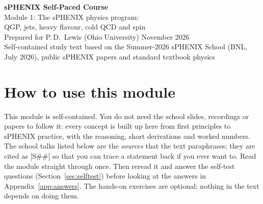 \documentclass[11pt,letterpaper]{article}
\begin{document}
\begin{center}
{\LARGE\bfseries sPHENIX Self-Paced Course}\\[4pt]
{\Large Module 1: The sPHENIX physics program:\\ QGP, jets, heavy flavour, cold QCD and spin}\\[8pt]
Prepared for P.\,D.\ Lewis (Ohio University) \quad November 2026\\[2pt]
\small Self-contained study text based on the Summer-2026 sPHENIX School (BNL, July 2026), public sPHENIX papers and standard textbook physics
\end{center}

\tableofcontents
\newpage

\section*{How to use this module}
This module is self-contained. You do not need the school slides, recordings or papers to follow it: every concept is
built up here from first principles to sPHENIX practice, with the reasoning, short derivations and worked numbers.
The school talks listed below are the \emph{sources} that the text paraphrases; they are cited as [S\#\#] so that you
can trace a statement back if you ever want to. Read the module straight through once. Then reread it and answer the
self-test questions (Section~\ref{sec:selftest}) before looking at the answers in Appendix~\ref{app:answers}.
The hands-on exercises are optional; nothing in the text depends on doing them.
\end{document}
